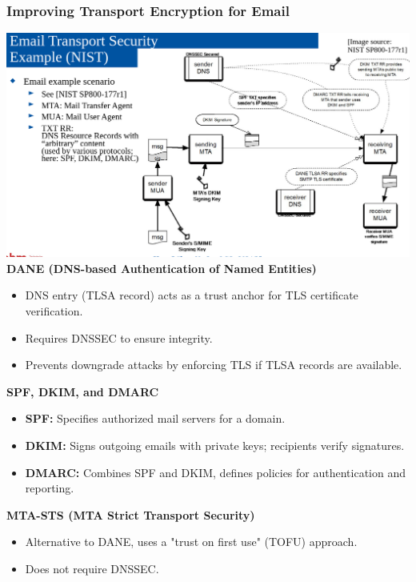 \subsubsection{Improving Transport Encryption for Email}
\includegraphics[width=\columnwidth]{Resources/mail.png}
\textbf{DANE (DNS-based Authentication of Named Entities)}  
\begin{itemize}
    \item DNS entry (TLSA record) acts as a trust anchor for TLS certificate verification.
    \item Requires DNSSEC to ensure integrity.
    \item Prevents downgrade attacks by enforcing TLS if TLSA records are available.
\end{itemize}
\textbf{SPF, DKIM, and DMARC}  
\begin{itemize}
    \item \textbf{SPF:} Specifies authorized mail servers for a domain.
    \item \textbf{DKIM:} Signs outgoing emails with private keys; recipients verify signatures.
    \item \textbf{DMARC:} Combines SPF and DKIM, defines policies for authentication and reporting.
\end{itemize}
\textbf{MTA-STS (MTA Strict Transport Security)}  
\begin{itemize}
    \item Alternative to DANE, uses a "trust on first use" (TOFU) approach.
    \item Does not require DNSSEC.
\end{itemize}

